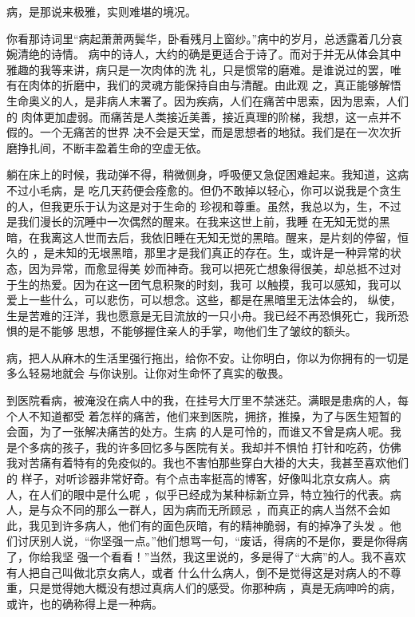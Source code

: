 \documentclass[12pt,a4paper]{article}
\begin{document}
		病，是那说来极雅，实则难堪的境况。

		你看那诗词里“病起萧萧两鬓华，卧看残月上窗纱。”病中的岁月，总透露着几分哀婉清绝的诗情。
	病中的诗人，大约的确是更适合于诗了。而对于并无从体会其中雅趣的我等来讲，病只是一次肉体的洗
	礼，只是惯常的磨难。是谁说过的罢，唯有在肉体的折磨中，我们的灵魂方能保持自由与清醒。由此观
	之，真正能够解悟生命奥义的人，是非病人末署了。因为疾病，人们在痛苦中思索，因为思索，人们的
	肉体更加虚弱。而痛苦是人类接近美善，接近真理的阶梯，我想，这一点并不假的。一个无痛苦的世界
	决不会是天堂，而是思想者的地狱。我们是在一次次折磨挣扎间，不断丰盈着生命的空虚无依。


		躺在床上的时候，我动弹不得，稍微侧身，呼吸便又急促困难起来。我知道，这病不过小毛病，是
	吃几天药便会痊愈的。但仍不敢掉以轻心，你可以说我是个贪生的人，但我更乐于认为这是对于生命的
	珍视和尊重。虽然，我总以为，生，不过是我们漫长的沉睡中一次偶然的醒来。在我来这世上前，我睡
	在无知无觉的黑暗，在我离这人世而去后，我依旧睡在无知无觉的黑暗。醒来，是片刻的停留，恒久的
	，是未知的无垠黑暗，那里才是我们真正的存在。生，或许是一种异常的状态，因为异常，而愈显得美
	妙而神奇。我可以把死亡想象得很美，却总抵不过对于生的热爱。因为在这一团气息积聚的时刻，我可
	以触摸，我可以感知，我可以爱上一些什么，可以悲伤，可以想念。这些，都是在黑暗里无法体会的，
	纵使，生是苦难的汪洋，我也愿意是无目流放的一只小舟。我已经不再恐惧死亡，我所恐惧的是不能够
	思想，不能够握住亲人的手掌，吻他们生了皱纹的额头。


		病，把人从麻木的生活里强行拖出，给你不安。让你明白，你以为你拥有的一切是多么轻易地就会
	与你诀别。让你对生命怀了真实的敬畏。

		到医院看病，被淹没在病人中的我，在挂号大厅里不禁迷茫。满眼是患病的人，每个人不知道都受
	着怎样的痛苦，他们来到医院，拥挤，推搡，为了与医生短暂的会面，为了一张解决痛苦的处方。生病
	的人是可怜的，而谁又不曾是病人呢。我是个多病的孩子，我的许多回忆多与医院有关。我却并不惧怕
	打针和吃药，仿佛我对苦痛有着特有的免疫似的。我也不害怕那些穿白大褂的大夫，我甚至喜欢他们的
	样子，对听诊器非常好奇。有个点击率挺高的博客，好像叫北京女病人。病人，在人们的眼中是什么呢
	，似乎已经成为某种标新立异，特立独行的代表。病人，是与众不同的那么一群人，因为病而无所顾忌
	，而真正的病人当然不会如此，我见到许多病人，他们有的面色灰暗，有的精神脆弱，有的掉净了头发
	。他们讨厌别人说，“你坚强一点。”他们想骂一句，“废话，得病的不是你，要是你得病了，你给我坚
	强一个看看！”当然，我这里说的，多是得了“大病”的人。我不喜欢有人把自己叫做北京女病人，或者
	什么什么病人，倒不是觉得这是对病人的不尊重，只是觉得她大概没有想过真病人们的感受。你那种病
	，真是无病呻吟的病，或许，也的确称得上是一种病。
\end{document}
